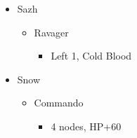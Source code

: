 \begin{menu}
	\begin{itemize}
		\crystarium
		\begin{itemize}
			\item Sazh
			      \begin{itemize}
				      \item Ravager
				            \begin{itemize}
					            \item Left 1, Cold Blood
				            \end{itemize}
			      \end{itemize}
			\item Snow
			      \begin{itemize}
				      \item Commando
				            \begin{itemize}
					            \item 4 nodes, HP+60
				            \end{itemize}
			      \end{itemize}
		\end{itemize}
	\end{itemize}
\end{menu}

